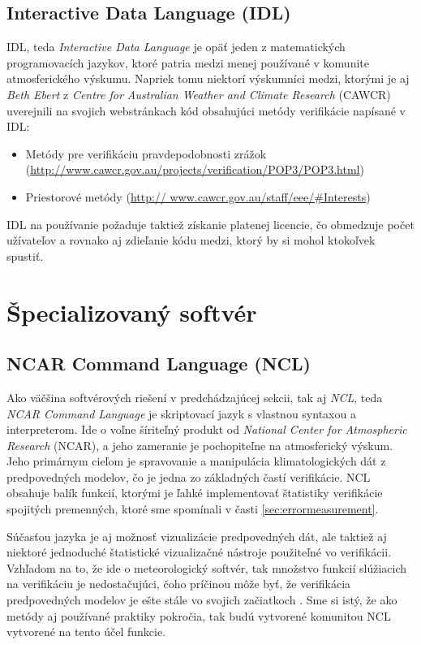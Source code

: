 \subsection[IDL]{Interactive Data Language (IDL)}
IDL, teda \textit{Interactive Data Language} je opäť jeden z matematických programovacích jazykov, ktoré patria medzi menej používané v komunite atmosferického výskumu. Napriek tomu niektorí výskumníci medzi, ktorými je aj \textit{Beth Ebert} z \textit{Centre for Australian Weather and Climate Research} (CAWCR) uverejnili na svojich webstránkach kód obsahujúci metódy verifikácie napísané v IDL:
\begin{itemize}
	\item Metódy pre verifikáciu pravdepodobnosti zrážok 	(\url{http://www.cawcr.gov.au/projects/verification/POP3/POP3.html})
	\item Priestorové metódy (\url{http://
		www.cawcr.gov.au/staff/eee/#Interests})
\end{itemize} 
IDL na používanie požaduje taktiež získanie platenej licencie, čo obmedzuje počet užívateľov a rovnako aj zdieľanie kódu medzi, ktorý by si mohol ktokoľvek spustiť.


\section{Špecializovaný softvér}

\subsection[NCL]{NCAR Command Language (NCL)}
Ako väčšina softvérových riešení v predchádzajúcej sekcii, tak aj \textit{NCL}, teda \textit{NCAR Command Language} \cite{NCL http://www.ncl.ucar.edu/} je skriptovací jazyk s vlastnou syntaxou a interpreterom. Ide o voľne šíriteľný produkt od \textit{National Center for Atmospheric Research} (NCAR), a jeho zameranie je pochopiteľne na atmosferický výskum. Jeho primárnym cieľom je spravovanie a manipulácia klimatologických dát z predpovedných modelov, čo je jedna zo základných častí verifikácie. NCL obsahuje balík funkcií, ktorými je ľahké implementovať štatistiky verifikácie spojitých premenných, ktoré sme spomínali v časti \ref{sec:errormeasurement}. 

Súčasťou jazyka je aj možnosť vizualizácie predpovedných dát, ale taktiež aj niektoré jednoduché štatistické vizualizačné nástroje použiteľné vo verifikácii. Vzhľadom na to, že ide o meteorologický softvér, tak množstvo funkcií slúžiacich na verifikáciu je nedostačujúci, čoho príčinou môže byť, že verifikácia predpovedných modelov je ešte stále vo svojich začiatkoch \cite{VerifSoft}. Sme si istý, že ako metódy aj používané praktiky pokročia, tak budú vytvorené komunitou NCL vytvorené na tento účel funkcie.

